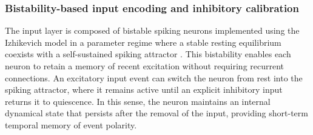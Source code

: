 
\subsubsection*{Bistability-based input encoding and inhibitory calibration}

The input layer is composed of bistable spiking neurons implemented using the Izhikevich model in a parameter regime where a stable resting equilibrium coexists with a self-sustained spiking attractor \cite{izhikevich2004model}. This bistability enables each neuron to retain a memory of recent excitation without requiring recurrent connections. An excitatory input event can switch the neuron from rest into the spiking attractor, where it remains active until an explicit inhibitory input returns it to quiescence. In this sense, the neuron maintains an internal dynamical state that persists after the removal of the input, providing short-term temporal memory of event polarity. 

